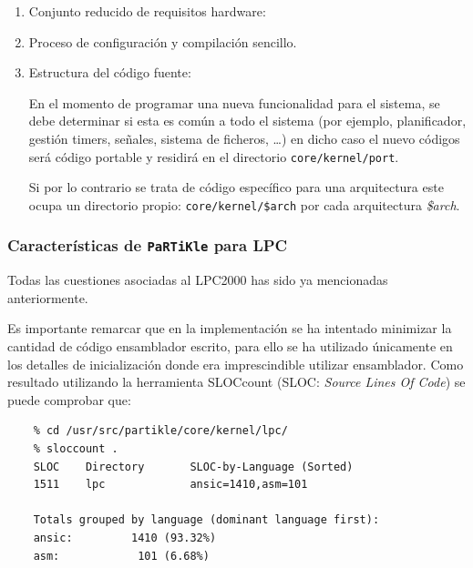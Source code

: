 \documentclass[10pt,a4paper]{article}
\newcommand{\partikle}[0]{\texttt{PaRTiKle}}
\newenvironment{itemize*}
        {\begin{itemize}%
                \setlength{\parskip}{2pt}%
                \setlength{\itemsep}{0pt}}
        {\end{itemize}}
\begin{document}
	\begin{enumerate}
	\item Conjunto reducido de requisitos hardware: 
		

	\item Proceso de configuración y compilación sencillo.

	\item Estructura del código fuente: 
	
	En el momento de programar una nueva funcionalidad para el sistema, se debe determinar si esta es común a todo el sistema (por ejemplo, planificador, gestión timers, señales, sistema de ficheros, \ldots) en dicho caso el nuevo códigos será código portable y residirá en el directorio \texttt{core/kernel/port}.
	
	Si por lo contrario se trata de código específico para una arquitectura este ocupa un directorio propio: \texttt{core/kernel/\$arch} por cada arquitectura \emph{\$arch}.
	\end{enumerate}
	
	\subsubsection{Características de \partikle{} para LPC}

	Todas las cuestiones asociadas al LPC2000 has sido ya mencionadas anteriormente.


	Es importante remarcar que en la implementación se ha intentado minimizar la cantidad de código ensamblador escrito, para ello se ha utilizado únicamente en los detalles de inicialización donde era imprescindible utilizar ensamblador.  Como resultado utilizando la herramienta SLOCcount (SLOC: \emph{Source Lines Of Code}) se puede comprobar que:

	\begin{verbatim}
	% cd /usr/src/partikle/core/kernel/lpc/
	% sloccount .
	SLOC    Directory       SLOC-by-Language (Sorted)
	1511    lpc             ansic=1410,asm=101
	
	Totals grouped by language (dominant language first):
	ansic:         1410 (93.32%)
	asm:            101 (6.68%)
	\end{verbatim}
	
\end{document}
